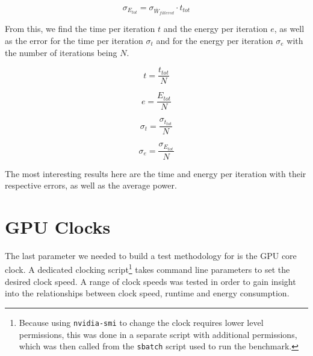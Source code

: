 \begin{equation}
\sigma_{E_{tot}} = \sigma_{\overline{W}_{filtered}} \cdot t_{tot}
\end{equation}

From this, we find the time per iteration \( t \) and the energy per iteration \( e \), as well as the error for the time per iteration \( \sigma_t \) and for the energy per iteration \( \sigma_e \) with the number of iterations being \( N \).

\begin{equation}
t = \frac{t_{tot}}{N}
\end{equation}

\begin{equation}
e = \frac{E_{tot}}{N}
\end{equation}

\begin{equation}
\sigma_t = \frac{\sigma_{t_{tot}}}{N}
\end{equation}

\begin{equation}
\sigma_e = \frac{\sigma_{E_{tot}}}{N}
\end{equation}

The most interesting results here are the time and energy per iteration with their respective errors, as well as the average power.


\section{GPU Clocks}
The last parameter we needed to build a test methodology for is the GPU core clock. A dedicated clocking script\footnote{Because using \texttt{nvidia-smi} to change the clock requires lower level permissions, this was done in a separate script with additional permissions, which was then called from the \texttt{sbatch} script used to run the benchmark.} takes command line parameters to set the desired clock speed. A range of clock speeds was tested in order to gain insight into the relationships between clock speed, runtime and energy consumption.